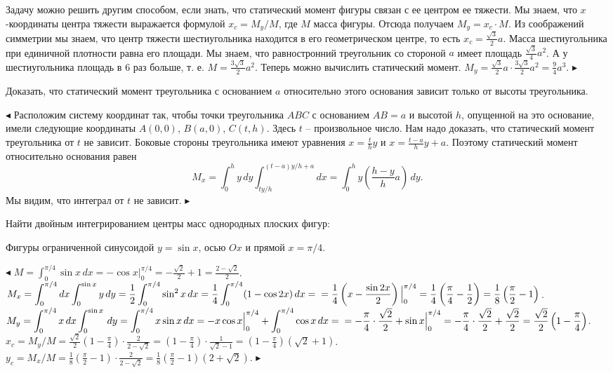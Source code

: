 \documentclass[a5paper,10pt]{article}
\begin{document}
\medskip\noindent
Задачу можно решить другим способом, если знать, что статический момент фигуры связан с ее центром ее
тяжести. Мы знаем, что $x$-координаты центра тяжести выражается формулой
$x_c=M_y/M$, где $M$ масса фигуры.
Отсюда получаем $M_y=x_c\cdot M$. Из соображений симметрии мы знаем,
что центр тяжести шестиугольника находится в его геометрическом центре, то есть
$\displaystyle x_c=\frac{\sqrt3}{2}a$. Масса шестиугольника при единичной плотности
равна его площади. Мы знаем, что равностронний треугольник со стороной $a$ имеет
площадь $\displaystyle \frac{\sqrt3}{4}a^2$. А у шестиугольника площадь в $6$ раз больше,
т. е. $\displaystyle M=\frac{3\sqrt3}{2}a^2$. Теперь можно вычислить статический момент.
$\displaystyle M_y=\frac{\sqrt3}{2}a\cdot \frac{3\sqrt3}{2}a^2=\frac94a^3.$ $\blacktriangleright$

\medskip
{} Доказать, что статический момент треугольника с основанием $a$ относительно этого основания зависит только от высоты треугольника.

\smallskip
\noindent $\blacktriangleleft$ Расположим систему координат так, чтобы точки треугольника $ABC$
с основанием $AB=a$ и высотой $h$, опущенной на это основание, имели следующие
координаты $A(0,0)$, $B(a,0)$, $C(t,h)$. Здесь $t$ -- произвольное число. Нам надо доказать,
что статический момент треугольника от $t$ не зависит. Боковые стороны треугольника
имеют уравнения $\displaystyle x=\frac th y$ и $\displaystyle x=\frac{t-a}{h}y+a$. Поэтому
статический момент относительно основания равен
$$\displaystyle M_x=\int_0^hy\,dy\int_{ty/h}^{(t-a)y/h+a} dx=\int_0^hy\left(\frac{h-y}{h}a\right)\,dy.$$
Мы видим, что интеграл от $t$ не зависит.
$\blacktriangleright$

\medskip
\noindent Найти двойным интегрированием центры масс однородных плоских фигур:

\medskip
{} Фигуры ограниченной синусоидой $y=\sin x$, осью $Ox$ и прямой $x=\pi/4$.

\smallskip
\noindent $\blacktriangleleft$
$\displaystyle M=\int_0^{\pi/4}\sin x\,dx=-\cos x\Big|_0^{\pi/4}=-\frac{\sqrt2}{2}+1=\frac{2-\sqrt2}{2}$.\\
$\displaystyle M_x=\int_0^{\pi/4}dx\int_0^{\sin x}y\,dy=\frac12\int_0^{\pi/4}\sin^2x\,dx=
\frac14\int_0^{\pi/4}(1-\cos2x)\,dx=\\
=\frac14\left(x-\frac{\sin2x}{2}\right)\Big|_0^{\pi/4}=\frac14\left(\frac{\pi}{4}-\frac12\right)=
\frac18\left(\frac{\pi}{2}-1\right)$.\\
$\displaystyle M_y=\int_0^{\pi/4}x\,dx\int_0^{\sin x}\,dy=\int_0^{\pi/4}x\sin x\,dx=
-x\cos x\Big|_0^{\pi/4}+\int_0^{\pi/4}\cos x\,dx=\\
=-\frac{\pi}{4}\cdot\frac{\sqrt2}{2}+\sin x\Big|_0^{\pi/4}=
-\frac{\pi}{4}\cdot\frac{\sqrt2}{2}+\frac{\sqrt2}{2}=\frac{\sqrt2}{2}\left(1-\frac{\pi}{4}\right)$.\\
$\displaystyle x_c=M_y/M=\frac{\sqrt2}{2}\left(1-\frac{\pi}{4}\right)\cdot\frac{2}{2-\sqrt2}=
\left(1-\frac{\pi}{4}\right)\cdot\frac{1}{\sqrt2-1}=\left(1-\frac{\pi}{4}\right)(\sqrt2+1)$.\\
$\displaystyle y_c=M_x/M=\frac18\left(\frac{\pi}{2}-1\right)\cdot\frac{2}{2-\sqrt2}=
\frac18\left(\frac{\pi}{2}-1\right)(2+\sqrt2)$.
$\blacktriangleright$
\end{document}
